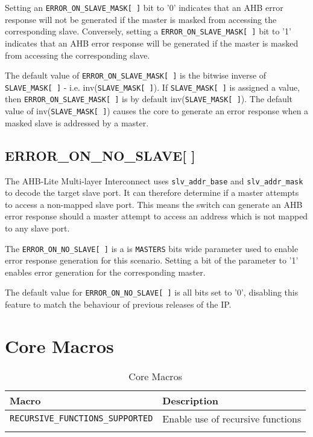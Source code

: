 Setting an \texttt{ERROR\_ON\_SLAVE\_MASK[\,]} bit to '0' indicates that an AHB error response will not be generated if the master is masked from accessing the corresponding slave.
Conversely, setting a \texttt{ERROR\_ON\_SLAVE\_MASK[\,]} bit to '1' indicates that an AHB error response will
be generated if the master is masked from accessing the corresponding slave.

The default value of \texttt{ERROR\_ON\_SLAVE\_MASK[\,]} is the bitwise inverse of \texttt{SLAVE\_MASK[\,]} - i.e. inv(\texttt{SLAVE\_MASK[\,]}). If \texttt{SLAVE\_MASK[\,]} is assigned a value, then \texttt{ERROR\_ON\_SLAVE\_MASK[\,]} is by default inv(\texttt{SLAVE\_MASK[\,]}). The default value of inv(\texttt{SLAVE\_MASK[\,]}) causes the core to generate an error response when a masked slave is addressed by a master.

\subsection{ERROR\_ON\_NO\_SLAVE[ ]}\label{error_on_no_slave}

The AHB-Lite Multi-layer Interconnect uses \texttt{slv\_addr\_base} and \texttt{slv\_addr\_mask} to decode the target slave port. It can therefore determine if a master attempts to access a non-mapped slave port. This means the switch can generate an AHB error response should a master attempt to access an address which is not mapped to any slave port.

The \texttt{ERROR\_ON\_NO\_SLAVE[\,]} is a is \texttt{MASTERS} bits wide parameter used to enable error response generation for this scenario. Setting a bit of the parameter to '1' enables error generation for the corresponding master. 

The default value for \texttt{ERROR\_ON\_NO\_SLAVE[\,]} is all bits set to '0', disabling this feature to match the behaviour of previous releases of the IP.

\section{Core Macros}\label{core-macros}

\begin{longtable}[]{@{}ll@{}}
\toprule
Macro & Description\tabularnewline
\midrule
\endhead
\texttt{RECURSIVE\_FUNCTIONS\_SUPPORTED} & Enable use of recursive functions \tabularnewline
\bottomrule
\caption{Core Macros}
\end{longtable}

